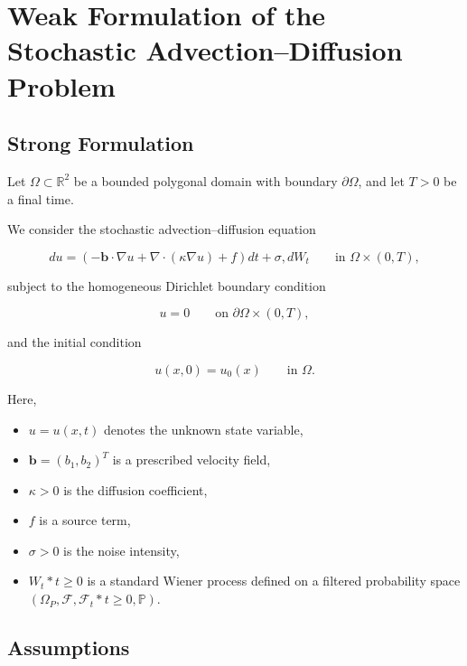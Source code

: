 
\section{Weak Formulation of the Stochastic Advection--Diffusion Problem}

\subsection{Strong Formulation}

Let $\Omega \subset \mathbb{R}^2$ be a bounded 
polygonal domain with boundary $\partial\Omega$, and 
let $T>0$ be a final time.

We consider the stochastic advection--diffusion equation

\begin{equation}
\label{eq:strong}
du=
\left(
-\mathbf b\cdot\nabla u
+\nabla\cdot(\kappa\nabla u)
+f
\right)dt
+\sigma,dW_t
\qquad \text{in } \Omega\times(0,T),
\end{equation}

subject to the homogeneous Dirichlet boundary condition

\begin{equation}
u=0
\qquad \text{on } \partial\Omega\times(0,T),
\end{equation}

and the initial condition

\begin{equation}
u(x,0)=u_0(x)
\qquad \text{in } \Omega.
\end{equation}

Here,

\begin{itemize}
\item $u=u(x,t)$ denotes the unknown state variable,
\item $\mathbf b=(b_1,b_2)^T$ is a prescribed velocity field,
\item $\kappa>0$ is the diffusion coefficient,
\item $f$ is a source term,
\item $\sigma>0$ is the noise intensity,
\item ${W_t}*{t\ge0}$ is a standard Wiener process defined on a filtered probability space
$(\Omega_P,\mathcal F,{\mathcal F_t}*{t\ge0},\mathbb P)$.
\end{itemize}

\subsection{Assumptions}

